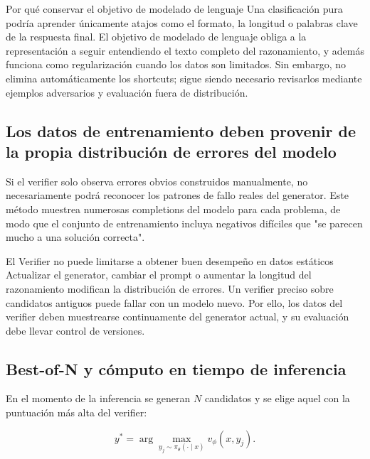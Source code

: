
\begin{knowledgebox}{Por qué conservar el objetivo de modelado de lenguaje}
Una clasificación pura podría aprender únicamente atajos como el formato, la longitud o palabras clave de la respuesta final. El objetivo de modelado de lenguaje obliga a la representación a seguir entendiendo el texto completo del razonamiento, y además funciona como regularización cuando los datos son limitados. Sin embargo, no elimina automáticamente los shortcuts; sigue siendo necesario revisarlos mediante ejemplos adversarios y evaluación fuera de distribución.
\end{knowledgebox}

\subsection{Los datos de entrenamiento deben provenir de la propia distribución de errores del modelo}

Si el verifier solo observa errores obvios construidos manualmente, no necesariamente podrá reconocer los patrones de fallo reales del generator. Este método muestrea numerosas completions del modelo para cada problema, de modo que el conjunto de entrenamiento incluya negativos difíciles que "se parecen mucho a una solución correcta".

\begin{warningbox}{El Verifier no puede limitarse a obtener buen desempeño en datos estáticos}
Actualizar el generator, cambiar el prompt o aumentar la longitud del razonamiento modifican la distribución de errores. Un verifier preciso sobre candidatos antiguos puede fallar con un modelo nuevo. Por ello, los datos del verifier deben muestrearse continuamente del generator actual, y su evaluación debe llevar control de versiones.
\end{warningbox}

\subsection{Best-of-N y cómputo en tiempo de inferencia}

En el momento de la inferencia se generan $N$ candidatos y se elige aquel con la puntuación más alta del verifier:

$$
y^*=\arg\max_{y_j\sim\pi_\theta(\cdot\mid x)} v_\phi(x,y_j).
$$

